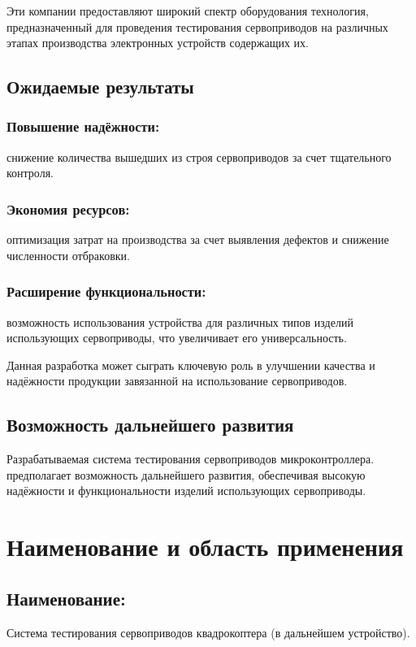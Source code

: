 \documentclass[a4paper]{bsuir-tor}
\begin{document}
  Эти компании предоставляют широкий спектр оборудования технология,
  предназначенный для проведения тестирования сервоприводов на
  различных этапах производства электронных устройств содержащих их.
  
  \subsection{Ожидаемые результаты}
  
  \subsubsection{Повышение надёжности: }
  снижение количества вышедших из строя сервоприводов за счет
  тщательного контроля.

  \subsubsection{Экономия ресурсов: }
  оптимизация затрат на производства за счет выявления дефектов и
  снижение численности отбраковки.
  
  \subsubsection{Расширение функциональности: }
  возможность использования устройства для различных типов изделий
  использующих сервоприводы, что увеличивает его универсальность.

  Данная разработка может сыграть ключевую роль в улучшении качества и
  надёжности продукции завязанной на использование сервоприводов.

  \subsection{Возможность дальнейшего развития}
  Разрабатываемая система тестирования сервоприводов микроконтроллера.
  предполагает возможность дальнейшего развития, обеспечивая высокую
  надёжности и функциональности изделий использующих сервоприводы.

\section{Наименование и область применения}
\subsection{Наименование: \newline}
Система тестирования сервоприводов квадрокоптера (в дальнейшем устройство).
\end{document}
